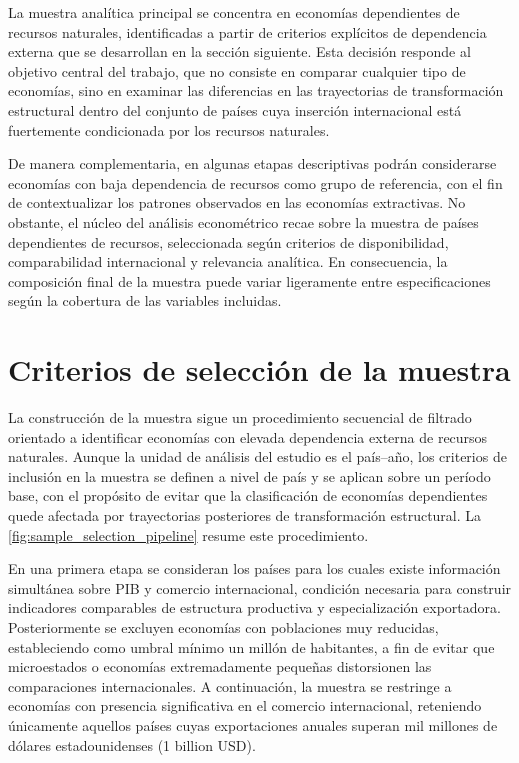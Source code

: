 \documentclass[../../PTFM.tex]{subfiles}
\begin{document}
	La muestra analítica principal se concentra en economías dependientes de
	recursos naturales, identificadas a partir de criterios explícitos de
	dependencia externa que se desarrollan en la sección siguiente. Esta
	decisión responde al objetivo central del trabajo, que no consiste en
	comparar cualquier tipo de economías, sino en examinar las diferencias en
	las trayectorias de transformación estructural dentro del conjunto de
	países cuya inserción internacional está fuertemente condicionada por los
	recursos naturales.

	De manera complementaria, en algunas etapas descriptivas podrán
	considerarse economías con baja dependencia de recursos como grupo de
	referencia, con el fin de contextualizar los patrones observados en las
	economías extractivas. No obstante, el núcleo del análisis econométrico
	recae sobre la muestra de países dependientes de recursos, seleccionada
	según criterios de disponibilidad, comparabilidad internacional y
	relevancia analítica. En consecuencia, la composición final de la muestra
	puede variar ligeramente entre especificaciones según la cobertura de las
	variables incluidas.

	\section{Criterios de selección de la muestra}
	\label{sec:criterios-seleccion-muestra}

	La construcción de la muestra sigue un procedimiento secuencial de
	filtrado orientado a identificar economías con elevada dependencia
	externa de recursos naturales. Aunque la unidad de análisis del estudio
	es el país--año, los criterios de inclusión en la muestra se definen a
	nivel de país y se aplican sobre un período base, con el propósito de
	evitar que la clasificación de economías dependientes quede afectada por
	trayectorias posteriores de transformación estructural. La
	\autoref{fig:sample_selection_pipeline} resume este procedimiento.

	En una primera etapa se consideran los países para los cuales existe
	información simultánea sobre PIB y comercio internacional, condición
	necesaria para construir indicadores comparables de estructura productiva
	y especialización exportadora. Posteriormente se excluyen economías con
	poblaciones muy reducidas, estableciendo como umbral mínimo un millón de
	habitantes, a fin de evitar que microestados o economías extremadamente
	pequeñas distorsionen las comparaciones internacionales. A continuación,
	la muestra se restringe a economías con presencia significativa en el
	comercio internacional, reteniendo únicamente aquellos países cuyas
	exportaciones anuales superan mil millones de dólares estadounidenses (1 billion USD).
\end{document}
